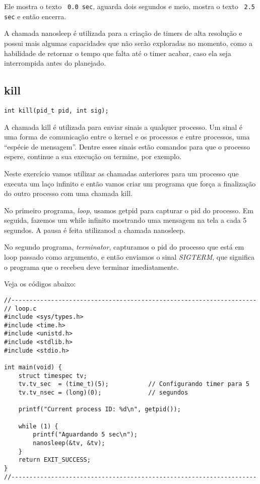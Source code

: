 Ele mostra o texto \texttt{ 0.0 sec}, aguarda dois segundos e meio, mostra o texto \texttt{ 2.5 sec} e então encerra.

A chamada nanosleep é utilizada para a criação de timers de alta resolução e possui mais algumas capacidades que não serão exploradas no momento, como a habilidade de retornar o tempo que falta até o timer acabar, caso ela seja interrompida antes do planejado.

\subsection{kill}

\begin{verbatim}
int kill(pid_t pid, int sig);
\end{verbatim}

A chamada kill é utilizada para enviar sinais a qualquer processo. Um sinal é uma forma de comunicação entre o kernel e os processos e entre processos, uma ``espécie de mensagem''. Dentre esses sinais estão comandos para que o processo espere, continue a sua execução ou termine, por exemplo.

Neste exercício vamos utilizar as chamadas anteriores para um processo que executa um laço infinito e então vamos criar um programa que força a finalização do outro processo com uma chamada kill.

No primeiro programa, \emph{loop}, usamos getpid para capturar o pid do processo. Em seguida, fazemos um while infinito mostrando uma mensagem na tela a cada 5 segundos. A pausa é feita utilizanod a chamada nanosleep.

No segundo programa, \emph{terminator}, capturamos o pid do processo que está em loop passado como argumento, e então enviamos o sinal \emph{SIGTERM}, que significa o programa que o recebeu deve terminar imediatamente.

Veja os códigos abaixo:

\begin{espacosimples}
\begin{verbatim}
//--------------------------------------------------------------------
// loop.c
#include <sys/types.h>
#include <time.h>
#include <unistd.h>
#include <stdlib.h>
#include <stdio.h>

int main(void) {
    struct timespec tv;
    tv.tv_sec  = (time_t)(5);           // Configurando timer para 5
    tv.tv_nsec = (long)(0);             // segundos
    
    printf("Current process ID: %d\n", getpid());
    
    while (1) {
        printf("Aguardando 5 sec\n");
        nanosleep(&tv, &tv);
    }
    return EXIT_SUCCESS;
}
//--------------------------------------------------------------------
\end{verbatim}
\end{espacosimples}

